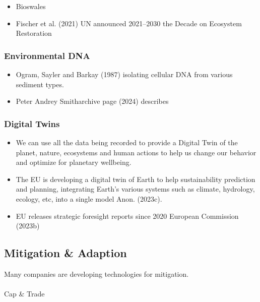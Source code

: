 \documentclass[
  letterpaper,
  DIV=11,
  numbers=noendperiod]{scrartcl}
\makeatletter
\let\oldparagraph\paragraph
\renewcommand{\paragraph}{
    \@ifstar
      \xxxParagraphStar
      \xxxParagraphNoStar
  }
\newcommand{\xxxParagraphStar}[1]{\oldparagraph*{#1}\mbox{}}
\newcommand{\xxxParagraphNoStar}[1]{\oldparagraph{#1}\mbox{}}
\makeatother
\begin{document}
\begin{itemize}
\item
  Bioswales
\item
  Fischer et al. (2021) UN announced 2021--2030 the Decade on Ecosystem
  Restoration
\end{itemize}

\subsubsection{\texorpdfstring{\textbf{Environmental
DNA}}{Environmental DNA}}\label{environmental-dna}

\begin{itemize}
\item
  Ogram, Sayler and Barkay (1987) isolating cellular DNA from various
  sediment types.
\item
  Peter Andrey Smitharchive page (2024) describes
\end{itemize}

\subsubsection{Digital Twins}\label{digital-twins}

\begin{itemize}
\item
  We can use all the data being recorded to provide a Digital Twin of
  the planet, nature, ecosystems and human actions to help us change our
  behavior and optimize for planetary wellbeing.
\item
  The EU is developing a digital twin of Earth to help sustainability
  prediction and planning, integrating Earth's various systems such as
  climate, hydrology, ecology, etc, into a single model Anon. (2023c).
\item
  EU releases strategic foresight reports since 2020 European Commission
  (2023b)
\end{itemize}

\subsection{Mitigation \& Adaption}\label{mitigation-adaption}

Many companies are developing technologies for mitigation.

\paragraph{Cap \& Trade}\label{cap-trade}
\end{document}
